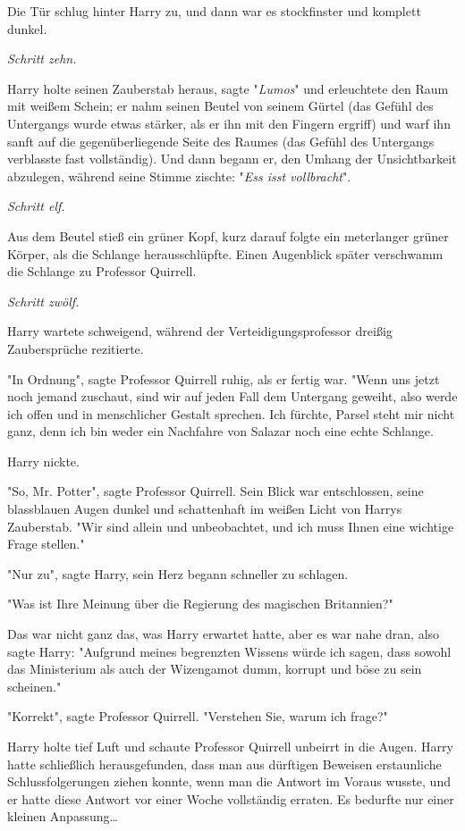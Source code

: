 {Die Tür schlug hinter Harry zu, und dann war es stockfinster und komplett dunkel.

\emph{Schritt zehn.}

Harry holte seinen Zauberstab heraus, sagte "\emph{Lumos}" und erleuchtete den Raum mit weißem Schein; er nahm seinen Beutel von seinem Gürtel (das Gefühl des Untergangs wurde etwas stärker, als er ihn mit den Fingern ergriff) und warf ihn sanft auf die gegenüberliegende Seite des Raumes (das Gefühl des Untergangs verblasste fast vollständig). Und dann begann er, den Umhang der Unsichtbarkeit abzulegen, während seine Stimme zischte: "\emph{Ess isst vollbracht}".

\emph{Schritt elf.}

Aus dem Beutel stieß ein grüner Kopf, kurz darauf folgte ein meterlanger grüner Körper, als die Schlange herausschlüpfte. Einen Augenblick später verschwamm die Schlange zu Professor Quirrell.

\emph{Schritt zwölf.}

Harry wartete schweigend, während der Verteidigungsprofessor dreißig Zaubersprüche rezitierte.

"In Ordnung", sagte Professor Quirrell ruhig, als er fertig war. "Wenn uns jetzt noch jemand zuschaut, sind wir auf jeden Fall dem Untergang geweiht, also werde ich offen und in menschlicher Gestalt sprechen. Ich fürchte, Parsel steht mir nicht ganz, denn ich bin weder ein Nachfahre von Salazar noch eine echte Schlange.

Harry nickte.

"So, Mr. Potter", sagte Professor Quirrell. Sein Blick war entschlossen, seine blassblauen Augen dunkel und schattenhaft im weißen Licht von Harrys Zauberstab. "Wir sind allein und unbeobachtet, und ich muss Ihnen eine wichtige Frage stellen."

"Nur zu", sagte Harry, sein Herz begann schneller zu schlagen.

"Was ist Ihre Meinung über die Regierung des magischen Britannien?"

Das war nicht ganz das, was Harry erwartet hatte, aber es war nahe dran, also sagte Harry: "Aufgrund meines begrenzten Wissens würde ich sagen, dass sowohl das Ministerium als auch der Wizengamot dumm, korrupt und böse zu sein scheinen."

"Korrekt", sagte Professor Quirrell. "Verstehen Sie, warum ich frage?"

Harry holte tief Luft und schaute Professor Quirrell unbeirrt in die Augen. Harry hatte schließlich herausgefunden, dass man aus dürftigen Beweisen erstaunliche Schlussfolgerungen ziehen konnte, wenn man die Antwort im Voraus wusste, und er hatte diese Antwort vor einer Woche vollständig erraten. Es bedurfte nur einer kleinen Anpassung…

}
